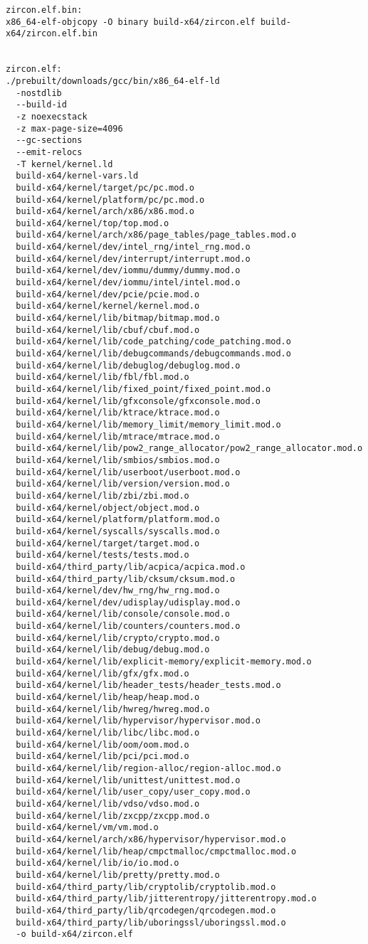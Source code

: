 \begin{verbatim}
zircon.elf.bin:
x86_64-elf-objcopy -O binary build-x64/zircon.elf build-x64/zircon.elf.bin


zircon.elf:
./prebuilt/downloads/gcc/bin/x86_64-elf-ld 
  -nostdlib 
  --build-id 
  -z noexecstack 
  -z max-page-size=4096 
  --gc-sections  
  --emit-relocs 
  -T kernel/kernel.ld 
  build-x64/kernel-vars.ld 
  build-x64/kernel/target/pc/pc.mod.o 
  build-x64/kernel/platform/pc/pc.mod.o 
  build-x64/kernel/arch/x86/x86.mod.o 
  build-x64/kernel/top/top.mod.o 
  build-x64/kernel/arch/x86/page_tables/page_tables.mod.o 
  build-x64/kernel/dev/intel_rng/intel_rng.mod.o 
  build-x64/kernel/dev/interrupt/interrupt.mod.o 
  build-x64/kernel/dev/iommu/dummy/dummy.mod.o 
  build-x64/kernel/dev/iommu/intel/intel.mod.o 
  build-x64/kernel/dev/pcie/pcie.mod.o 
  build-x64/kernel/kernel/kernel.mod.o 
  build-x64/kernel/lib/bitmap/bitmap.mod.o 
  build-x64/kernel/lib/cbuf/cbuf.mod.o 
  build-x64/kernel/lib/code_patching/code_patching.mod.o 
  build-x64/kernel/lib/debugcommands/debugcommands.mod.o 
  build-x64/kernel/lib/debuglog/debuglog.mod.o 
  build-x64/kernel/lib/fbl/fbl.mod.o 
  build-x64/kernel/lib/fixed_point/fixed_point.mod.o 
  build-x64/kernel/lib/gfxconsole/gfxconsole.mod.o 
  build-x64/kernel/lib/ktrace/ktrace.mod.o 
  build-x64/kernel/lib/memory_limit/memory_limit.mod.o 
  build-x64/kernel/lib/mtrace/mtrace.mod.o 
  build-x64/kernel/lib/pow2_range_allocator/pow2_range_allocator.mod.o 
  build-x64/kernel/lib/smbios/smbios.mod.o 
  build-x64/kernel/lib/userboot/userboot.mod.o 
  build-x64/kernel/lib/version/version.mod.o 
  build-x64/kernel/lib/zbi/zbi.mod.o 
  build-x64/kernel/object/object.mod.o 
  build-x64/kernel/platform/platform.mod.o 
  build-x64/kernel/syscalls/syscalls.mod.o 
  build-x64/kernel/target/target.mod.o 
  build-x64/kernel/tests/tests.mod.o 
  build-x64/third_party/lib/acpica/acpica.mod.o 
  build-x64/third_party/lib/cksum/cksum.mod.o 
  build-x64/kernel/dev/hw_rng/hw_rng.mod.o 
  build-x64/kernel/dev/udisplay/udisplay.mod.o 
  build-x64/kernel/lib/console/console.mod.o 
  build-x64/kernel/lib/counters/counters.mod.o 
  build-x64/kernel/lib/crypto/crypto.mod.o 
  build-x64/kernel/lib/debug/debug.mod.o 
  build-x64/kernel/lib/explicit-memory/explicit-memory.mod.o 
  build-x64/kernel/lib/gfx/gfx.mod.o 
  build-x64/kernel/lib/header_tests/header_tests.mod.o 
  build-x64/kernel/lib/heap/heap.mod.o 
  build-x64/kernel/lib/hwreg/hwreg.mod.o 
  build-x64/kernel/lib/hypervisor/hypervisor.mod.o 
  build-x64/kernel/lib/libc/libc.mod.o 
  build-x64/kernel/lib/oom/oom.mod.o 
  build-x64/kernel/lib/pci/pci.mod.o 
  build-x64/kernel/lib/region-alloc/region-alloc.mod.o 
  build-x64/kernel/lib/unittest/unittest.mod.o 
  build-x64/kernel/lib/user_copy/user_copy.mod.o 
  build-x64/kernel/lib/vdso/vdso.mod.o 
  build-x64/kernel/lib/zxcpp/zxcpp.mod.o 
  build-x64/kernel/vm/vm.mod.o 
  build-x64/kernel/arch/x86/hypervisor/hypervisor.mod.o 
  build-x64/kernel/lib/heap/cmpctmalloc/cmpctmalloc.mod.o 
  build-x64/kernel/lib/io/io.mod.o 
  build-x64/kernel/lib/pretty/pretty.mod.o 
  build-x64/third_party/lib/cryptolib/cryptolib.mod.o 
  build-x64/third_party/lib/jitterentropy/jitterentropy.mod.o 
  build-x64/third_party/lib/qrcodegen/qrcodegen.mod.o 
  build-x64/third_party/lib/uboringssl/uboringssl.mod.o 
  -o build-x64/zircon.elf


\end{verbatim}
